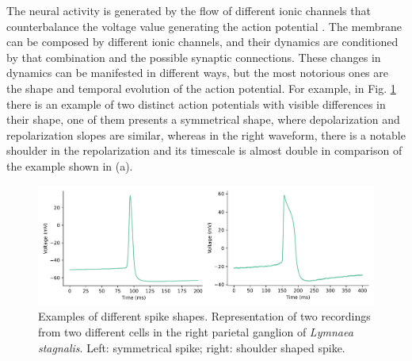 The neural activity is generated by the flow of different ionic channels that counterbalance the voltage value generating the action potential \parencite{koch_biophysics_1999}. The membrane can be composed by different ionic channels, and their dynamics are conditioned by that combination and the possible synaptic connections. These changes in dynamics can be manifested in different ways, but the most notorious ones are the shape and temporal evolution of the action potential. %
For example, in Fig. \ref{fig:spike-types} there is an example of two distinct action potentials with visible differences in their shape, one of them presents a symmetrical shape, where depolarization and repolarization slopes are similar, whereas in the right waveform, there is a notable shoulder in the repolarization and its timescale is almost double in comparison of the example shown in (a).

\begin{figure}[htb!]
    \centering
    \includegraphics[width=\linewidth]{img/intro/spike-types.pdf}
    \caption{Examples of different spike shapes. Representation of two recordings from two different cells in the right parietal ganglion of \textit{Lymnaea stagnalis}. Left: symmetrical spike; right: shoulder shaped spike.}
    \label{fig:spike-types}
\end{figure}

